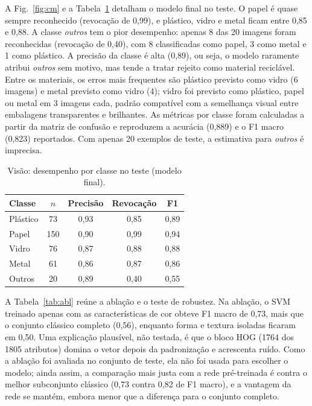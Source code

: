 \documentclass[conference]{IEEEtran}
\begin{document}
A Fig.~\ref{fig:cm} e a Tabela~\ref{tab:classes} detalham o modelo final no teste. O papel é quase sempre reconhecido (revocação de 0,99), e plástico, vidro e metal ficam entre 0,85 e 0,88. A classe \emph{outros} tem o pior desempenho: apenas 8 das 20 imagens foram reconhecidas (revocação de 0,40), com 8 classificadas como papel, 3 como metal e 1 como plástico. A precisão da classe é alta (0,89), ou seja, o modelo raramente atribui \emph{outros} sem motivo, mas tende a tratar rejeito como material reciclável. Entre os materiais, os erros mais frequentes são plástico previsto como vidro (6 imagens) e metal previsto como vidro (4); vidro foi previsto como plástico, papel ou metal em 3 imagens cada, padrão compatível com a semelhança visual entre embalagens transparentes e brilhantes. As métricas por classe foram calculadas a partir da matriz de confusão e reproduzem a acurácia (0,889) e o F1 macro (0,823) reportados. Com apenas 20 exemplos de teste, a estimativa para \emph{outros} é imprecisa.

\begin{table}[t]
\caption{Visão: desempenho por classe no teste (modelo final).}\label{tab:classes}\centering
\begin{tabular}{lcccc}\toprule
Classe & $n$ & Precisão & Revocação & F1\\\midrule
Plástico & 73 & 0,93 & 0,85 & 0,89\\
Papel & 150 & 0,90 & 0,99 & 0,94\\
Vidro & 76 & 0,87 & 0,88 & 0,88\\
Metal & 61 & 0,86 & 0,87 & 0,86\\
Outros & 20 & 0,89 & 0,40 & 0,55\\\bottomrule
\end{tabular}
\end{table}

A Tabela~\ref{tab:abl} reúne a ablação e o teste de robustez. Na ablação, o SVM treinado apenas com as características de cor obteve F1 macro de 0,73, mais que o conjunto clássico completo (0,56), enquanto forma e textura isoladas ficaram em 0,50. Uma explicação plausível, não testada, é que o bloco HOG (1764 dos 1805 atributos) domina o vetor depois da padronização e acrescenta ruído. Como a ablação foi avaliada no conjunto de teste, ela não foi usada para escolher o modelo; ainda assim, a comparação mais justa com a rede pré-treinada é contra o melhor subconjunto clássico (0,73 contra 0,82 de F1 macro), e a vantagem da rede se mantém, embora menor que a diferença para o conjunto completo.
\end{document}
